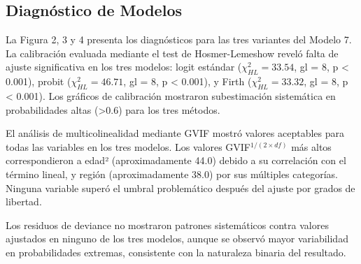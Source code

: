 \documentclass[
  spanish,
  10pt,
]{article}
\begin{document}
\subsection{Diagnóstico de Modelos}\label{diagnuxf3stico-de-modelos}

La Figura 2, 3 y 4 presenta los diagnósticos para las tres variantes del
Modelo 7. La calibración evaluada mediante el test de Hosmer-Lemeshow
reveló falta de ajuste significativa en los tres modelos: logit estándar
(\(\chi^2_{HL} = 33.54\), gl = 8, p \textless{} 0.001), probit
(\(\chi^2_{HL} = 46.71\), gl = 8, p \textless{} 0.001), y Firth
(\(\chi^2_{HL} = 33.32\), gl = 8, p \textless{} 0.001). Los gráficos de
calibración mostraron subestimación sistemática en probabilidades altas
(\textgreater0.6) para los tres métodos.

El análisis de multicolinealidad mediante GVIF mostró valores aceptables
para todas las variables en los tres modelos. Los valores
GVIF\(^{1/(2 \times df)}\) más altos correspondieron a edad²
(aproximadamente 44.0) debido a su correlación con el término lineal, y
región (aproximadamente 38.0) por sus múltiples categorías. Ninguna
variable superó el umbral problemático después del ajuste por grados de
libertad.

Los residuos de deviance no mostraron patrones sistemáticos contra
valores ajustados en ninguno de los tres modelos, aunque se observó
mayor variabilidad en probabilidades extremas, consistente con la
naturaleza binaria del resultado.

\newpage
\end{document}
